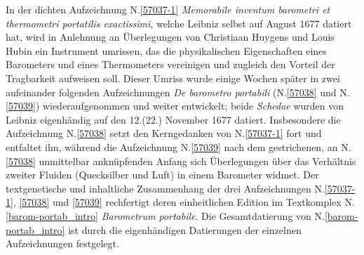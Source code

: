 \footnotesize%
\pstart%
\noindent%
In der dichten Aufzeichnung N.\;\ref{57037-1} \textit{Memorabile inventum barometri et thermometri portatilis exactissimi}, welche Leibniz selbst auf August 1677 datiert hat, wird in Anlehnung an Überlegungen von Christiaan Huygens und Louis Hubin ein Instrument umrissen, das die physikalischen Eigenschaften eines Barometers und eines Thermometers vereinigen und zugleich den Vorteil der Tragbarkeit aufweisen soll.
Dieser Umriss wurde einige Wochen später in zwei aufeinander folgenden Aufzeichnungen \textit{De barometro portabili} (N.\;\ref{57038} und N.\;\ref{57039}) wiederaufgenommen und weiter entwickelt;
beide \textit{Schedae} wurden von Leibniz eigenhändig auf den 12.\;(22.) November 1677 datiert.
Insbesondere die Aufzeichnung N.\;\ref{57038} setzt den Kerngedanken von N.\;\ref{57037-1} fort und entfaltet ihn, während die Aufzeichnung N.\;\ref{57039} nach dem gestrichenen, an N.\;\ref{57038} unmittelbar anknüpfenden Anfang sich Überlegungen über das Verhältnis zweiter Fluiden (Quecksilber und Luft) in einem Barometer widmet.
\pend%
\pstart%
Der textgenetische und inhaltliche Zusammenhang der drei Aufzeichnungen N.\;\ref{57037-1}, \ref{57038} und \ref{57039} rechfertigt deren einheitlichen Edition im Textkomplex N.\;\ref{barom-portab_intro} \textit{Barometrum portabile}.
Die Gesamtdatierung von N.\;\ref{barom-portab_intro} ist durch die eigenhändigen Datierungen der einzelnen Aufzeichnungen festgelegt.
\pend%
%
\frenchspacing%
\normalsize%
